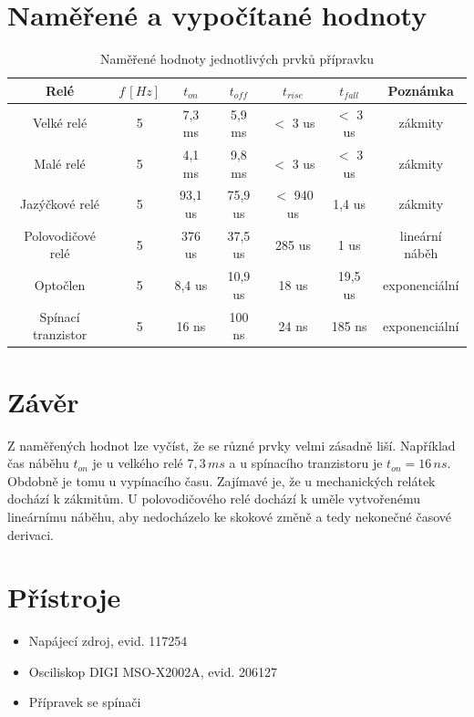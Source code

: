 \documentclass[12pt]{article} %
\begin{document}
\section{Naměřené a vypočítané hodnoty}
\begin{table}[H]
\caption{Naměřené hodnoty jednotlivých prvků přípravku}
\begin{tabular}{|c|c|c|c|c|c|c|}
\hline 
Relé & $f\,[Hz]$ & $t_{on}$ & $t_{off}$ & $t_{rise}$ & $t_{fall}$ & Poznámka \\ 
\hline 
Velké relé & 5 & 7,3 ms & 5,9 ms & $<$ 3 us & $<$ 3 us & zákmity \\ 
\hline 
Malé relé & 5 & 4,1 ms & 9,8 ms & $<$ 3 us & $<$ 3 us & zákmity \\ 
\hline 
Jazýčkové relé & 5 & 93,1 us & 75,9 us & $<$ 940 us & 1,4 us & zákmity \\ 
\hline 
Polovodičové relé & 5 & 376 us & 37,5 us & 285 us & 1 us & lineární náběh \\ 
\hline 
Optočlen & 5 & 8,4 us & 10,9 us & 18 us & 19,5 us & exponenciální \\ 
\hline 
Spínací tranzistor & 5 & 16 ns & 100 ns & 24 ns & 185 ns & exponenciální \\ 
\hline 
\end{tabular} 
\end{table}

\section{Závěr}
Z naměřených hodnot lze vyčíst, že se různé prvky velmi zásadně liší. Například čas náběhu $t_{on}$ je u velkého relé $7,3\,ms$ a u spínacího tranzistoru je $t_{on} = 16\,ns$. Obdobně je tomu u vypínacího času. Zajímavé je, že u mechanických relátek dochází k zákmitům. U polovodičového relé dochází k uměle vytvořenému lineárnímu náběhu, aby nedocházelo ke skokové změně a tedy nekonečné časové derivaci.

\section{Přístroje}
\begin{itemize}
\item Napájecí zdroj, evid. 117254
\item Osciliskop DIGI MSO-X2002A, evid. 206127
\item Přípravek se spínači
\end{itemize}
\end{document}
